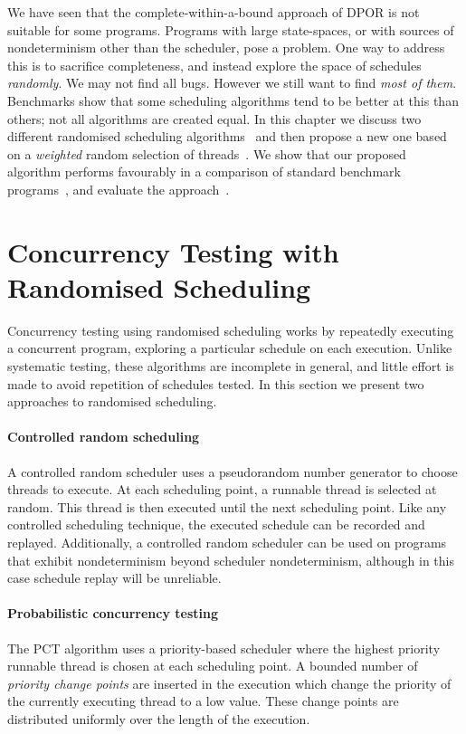 We have seen that the complete-within-a-bound approach of DPOR is not
suitable for some programs.  Programs with large state-spaces, or with
sources of nondeterminism other than the scheduler, pose a problem.
One way to address this is to sacrifice completeness, and instead
explore the space of schedules \emph{randomly}.  We may not find all
bugs.  However we still want to find \emph{most of them}.  Benchmarks
show that some scheduling algorithms tend to be better at this than
others; not all algorithms are created equal.  In this chapter we
discuss two different randomised scheduling
algorithms~ and then propose a new one based on
a \emph{weighted} random selection of threads~.
We show that our proposed algorithm performs favourably in a
comparison of standard benchmark programs~, and
evaluate the approach~.

\section{Concurrency Testing with Randomised Scheduling}
\label{sec:algorithms-usual}

Concurrency testing using randomised scheduling works by repeatedly
executing a concurrent program, exploring a particular schedule on
each execution.  Unlike systematic testing, these algorithms are
incomplete in general, and little effort is made to avoid repetition
of schedules tested.  In this section we present two approaches to
randomised scheduling.

\paragraph{Controlled random scheduling}
A controlled random scheduler uses a pseudorandom number generator to
choose threads to execute.  At each scheduling point, a runnable
thread is selected at random.  This thread is then executed until the
next scheduling point.  Like any controlled scheduling technique, the
executed schedule can be recorded and replayed.  Additionally, a
controlled random scheduler can be used on programs that exhibit
nondeterminism beyond scheduler nondeterminism, although in this case
schedule replay will be unreliable\cite{thomson2016}.

\paragraph{Probabilistic concurrency testing}
The PCT algorithm\cite{burckhardt2010} uses a priority-based scheduler where the
highest priority runnable thread is chosen at each scheduling point.  A bounded
number of \emph{priority change points} are inserted in the execution which
change the priority of the currently executing thread to a low value.  These
change points are distributed uniformly over the length of the execution.

